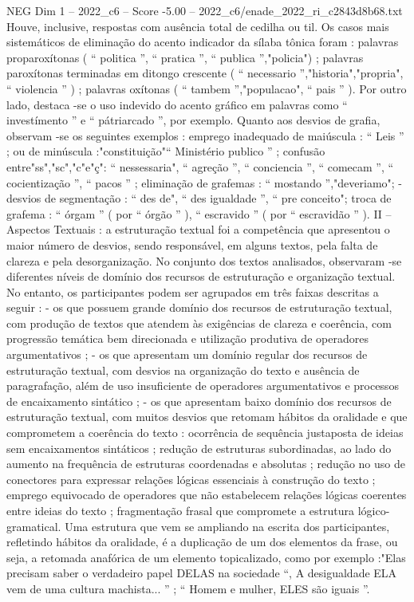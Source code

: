 \begin{textsample}{NEG Dim 1 – 2022\_c6 – Score -5.00 – 2022\_c6/enade\_2022\_ri\_c2843d8b68.txt}
Houve, inclusive, respostas com ausência total de cedilha ou til.
Os casos mais sistemáticos de eliminação do acento indicador da sílaba tônica foram : palavras proparoxítonas ( “ politica ”, “ pratica ”, “ publica ”,"policia") ; palavras paroxítonas terminadas em ditongo crescente ( “ necessario ”,"historia","propria", “ violencia ” ) ; palavras oxítonas ( “ tambem ”,"populacao", “ pais ” ).
Por outro lado, destaca -se o uso indevido do acento gráfico em palavras como “ investímento ” e “ pátriarcado ”, por exemplo.
Quanto aos desvios de grafia, observam -se os seguintes exemplos : emprego inadequado de maiúscula : “ Leis ” ; ou de minúscula :"constituição"“ Ministério publico ” ; confusão entre"ss","sc","c"e"ç": “ nessessaria", “ agreção ”, “ conciencia ”, “ comecam ”, “ cocientização ”, “ pacos ” ; eliminação de grafemas : “ mostando ”,"deveriamo"; - desvios de segmentação : “ des de", “ des igualdade ”, “ pre conceito"; troca de grafema : “ órgam ” ( por “ órgão ” ), “ escravido ” ( por “ escravidão ” ).
II – Aspectos Textuais : a estruturação textual foi a competência que apresentou o maior número de desvios, sendo responsável, em alguns textos, pela falta de clareza e pela desorganização.
No conjunto dos textos analisados, observaram -se diferentes níveis de domínio dos recursos de estruturação e organização textual.
No entanto, os participantes podem ser agrupados em três faixas descritas a seguir : - os que possuem grande domínio dos recursos de estruturação textual, com produção de textos que atendem às exigências de clareza e coerência, com progressão temática bem direcionada e utilização produtiva de operadores argumentativos ; - os que apresentam um domínio regular dos recursos de estruturação textual, com desvios na organização do texto e ausência de paragrafação, além de uso insuficiente de operadores argumentativos e processos de encaixamento sintático ; - os que apresentam baixo domínio dos recursos de estruturação textual, com muitos desvios que retomam hábitos da oralidade e que comprometem a coerência do texto : ocorrência de sequência justaposta de ideias sem encaixamentos sintáticos ; redução de estruturas subordinadas, ao lado do aumento na frequência de estruturas coordenadas e absolutas ; redução no uso de conectores para expressar relações lógicas essenciais à construção do texto ; emprego equivocado de operadores que não estabelecem relações lógicas coerentes entre ideias do texto ; fragmentação frasal que compromete a estrutura lógico-gramatical.
Uma estrutura que vem se ampliando na escrita dos participantes, refletindo hábitos da oralidade, é a duplicação de um dos elementos da frase, ou seja, a retomada anafórica de um elemento topicalizado, como por exemplo :"Elas precisam saber o verdadeiro papel DELAS na sociedade “, A desigualdade ELA vem de uma cultura machista... ” ; “ Homem e mulher, ELES são iguais ”.

\end{textsample}
